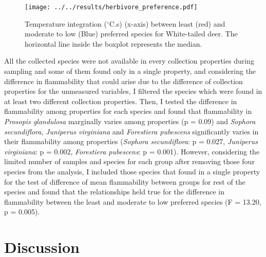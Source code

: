 \documentclass{ttuthes2007}
\begin{document}



\begin{figure}[ht]
     \centering
     \texttt{[image: ../../results/herbivore\_preference.pdf]}
     \caption{Temperature integration ($^{\circ}$C.s) (x-axis) between least (red) and moderate to low (Blue) preferred species for White-tailed deer. The horizontal line inside the boxplot represents the median.}
     \label{fig:herbivore_pref}   
 \end{figure}

All the collected species were not available in every collection properties during sampling and some of them found only in a single property, and considering the difference in flammability that could arise due to the difference of collection properties for the unmeasured variables, I filtered the species which were found in at least two different collection properties. Then, I tested the difference in flammability among properties for each species and found that flammability in \emph{Prosopis glandulosa} marginally varies among properties (p = 0.09) and \emph{Sophora secundiflora}, \emph{Juniperus virginiana} and \emph{Forestiera pubescens} significantly varies in their flammability among properties (\emph{Sophora secundiflora}: p = 0.027, \emph{Juniperus virginiana}: p = 0.002, \emph{Forestiera pubescens}: p = 0.001). However, considering the limited number of samples and species for each group after removing those four species from the analysis, I included those species that found in a single property for the test of difference of mean flammability between groups for rest of the species and found that the relationships held true for the difference in flammability between the least and moderate to low preferred species (F = 13.20, p = 0.005).\

\section{Discussion}
\end{document}

